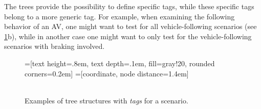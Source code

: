 The trees provide the possibility to define specific tags, while these specific tags belong to a more generic tag. For example, when examining the following behavior of an AV, one might want to test for all vehicle-following scenarios (see \cref{fig:tag trees}b), while in another case one might want to only test for the vehicle-following scenarios with braking involved.


\begin{figure}
	\centering
	=[text height=.8em, text depth=.1em, fill=gray!20, rounded corners=0.2em]
	=[coordinate, node distance=1.4em]
	 \\
	\\
	\caption{Examples of tree structures with \emph{tags} for a scenario.}
	\label{fig:tag trees}
\end{figure}


\cbend